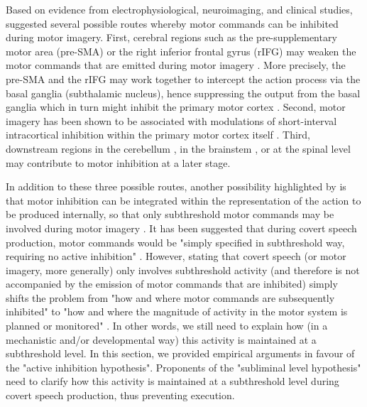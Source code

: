 \documentclass[utf8]{template/frontiersSCNS} %
\begin{document}
Based on evidence from electrophysiological, neuroimaging, and clinical studies, \cite{guillot_imagining_2012} suggested several possible routes whereby motor commands can be inhibited during motor imagery. First, cerebral regions such as the pre-supplementary motor area (pre-SMA) \citep{kasess_suppressive_2008} or the right inferior frontal gyrus (rIFG) may weaken the motor commands that are emitted during motor imagery \citep[e.g.,][]{angelini_motor_2015, angelini_proactive_2016}. More precisely, the pre-SMA and the rIFG may work together to intercept the action process via the basal ganglia (subthalamic nucleus), hence suppressing the output from the basal ganglia which in turn might inhibit the primary motor cortex \citep{aron_reactive_2011}. Second, motor imagery has been shown to be associated with modulations of short-interval intracortical inhibition within the primary motor cortex itself \citep{neige_unravelling_2020}. Third, downstream regions in the cerebellum \citep[e.g.,][]{lotze_activation_1999}, in the brainstem \citep[e.g.,][]{jeannerod_neural_2001, jeannerod_motor_2006}, or at the spinal level may contribute to motor inhibition at a later stage.

In addition to these three possible routes, another possibility highlighted by \cite{guillot_imagining_2012} is that motor inhibition can be integrated within the representation of the action to be produced internally, so that only subthreshold motor commands may be involved during motor imagery \citep[hereafter referred to as the "subliminal level hypothesis", see also][]{bach_why_2021, glover_executive_2020}. It has been suggested that during covert speech production, motor commands would be "simply specified in subthreshold way, requiring no active inhibition" \citep{geva_inner_2018}. However, stating that covert speech (or motor imagery, more generally) only involves subthreshold activity (and therefore is not accompanied by the emission of motor commands that are inhibited) simply shifts the problem from "how and where motor commands are subsequently inhibited" to "how and where the magnitude of activity in the motor system is planned or monitored" \citep[see also][]{scheil_motor_2018}. In other words, we still need to explain how (in a mechanistic and/or developmental way) this activity is maintained at a subthreshold level. In this section, we provided empirical arguments in favour of the "active inhibition hypothesis". Proponents of the "subliminal level hypothesis" need to clarify how this activity is maintained at a subthreshold level during covert speech production, thus preventing execution.
\end{document}
